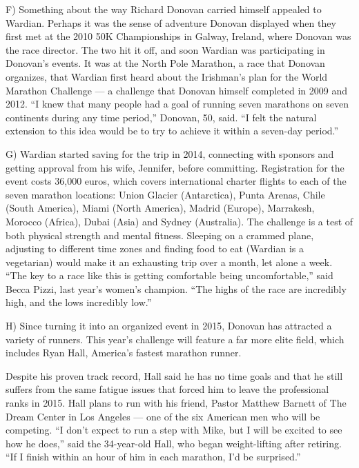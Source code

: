\documentclass[UTF8,11pt]{ctexart}
\begin{document}
F) Something about the way Richard Donovan carried himself appealed to Wardian. Perhaps it was the sense of adventure Donovan displayed when they first met at the 2010 50K Championships in Galway, Ireland, where Donovan was the race director. The two hit it off, and soon Wardian was participating in Donovan’s events. It was at the North Pole Marathon, a race that Donovan organizes, that Wardian first heard about the Irishman’s plan for the World Marathon Challenge — a challenge that Donovan himself completed in 2009 and 2012. “I knew that many people had a goal of running seven marathons on seven continents during any time period,” Donovan, 50, said. “I felt the natural extension to this idea would be to try to achieve it within a seven-day period.”


G) Wardian started saving for the trip in 2014, connecting with sponsors and getting approval from his wife, Jennifer, before committing. Registration for the event costs 36,000 euros, which covers international charter flights to each of the seven marathon locations: Union Glacier (Antarctica), Punta Arenas, Chile (South America), Miami (North America), Madrid (Europe), Marrakesh, Morocco (Africa), Dubai (Asia) and Sydney (Australia). The challenge is a test of both physical strength and mental fitness. Sleeping on a crammed plane, adjusting to different time zones and finding food to eat (Wardian is a vegetarian) would make it an exhausting trip over a month, let alone a week. “The key to a race like this is getting comfortable being uncomfortable,” said Becca Pizzi, last year’s women’s champion. “The highs of the race are incredibly high, and the lows incredibly low.”


H) Since turning it into an organized event in 2015, Donovan has attracted a variety of runners. This year’s challenge will feature a far more elite field, which includes Ryan Hall, America’s fastest marathon runner.


Despite his proven track record, Hall said he has no time goals and that he still suffers from the same fatigue issues that forced him to leave the professional ranks in 2015. Hall plans to run with his friend, Pastor Matthew Barnett of The Dream Center in Los Angeles — one of the six American men who will be competing. “I don’t expect to run a step with Mike, but I will be excited to see how he does,” said the 34-year-old Hall, who began weight-lifting after retiring. “If I finish within an hour of him in each marathon, I’d be surprised.”
\end{document}
